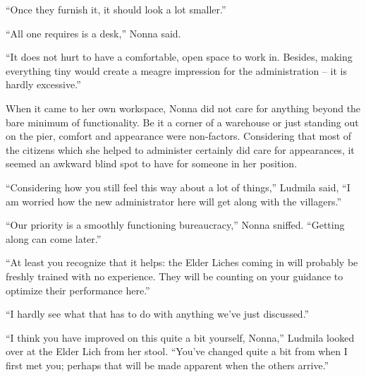  

“Once they furnish it, it should look a lot smaller.”

 

“All one requires is a desk,” Nonna said.

 

“It does not hurt to have a comfortable, open space to work in. Besides, making everything tiny would create a meagre impression for the administration – it is hardly excessive.”

 

When it came to her own workspace, Nonna did not care for anything beyond the bare minimum of functionality. Be it a corner of a warehouse or just standing out on the pier, comfort and appearance were non-factors. Considering that most of the citizens which she helped to administer certainly did care for appearances, it seemed an awkward blind spot to have for someone in her position.

 

“Considering how you still feel this way about a lot of things,” Ludmila said, “I am worried how the new administrator here will get along with the villagers.”

 

“Our priority is a smoothly functioning bureaucracy,” Nonna sniffed. “Getting along can come later.”

 

“At least you recognize that it helps: the Elder Liches coming in will probably be freshly trained with no experience. They will be counting on your guidance to optimize their performance here.”

 

“I hardly see what that has to do with anything we’ve just discussed.”

 

“I think you have improved on this quite a bit yourself, Nonna,” Ludmila looked over at the Elder Lich from her stool. “You’ve changed quite a bit from when I first met you; perhaps that will be made apparent when the others arrive.”